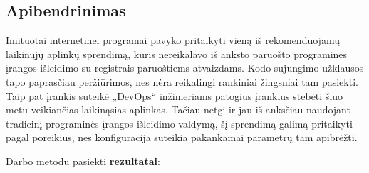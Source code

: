 \documentclass{VUMIFPSkursinis}
\begin{document}
\subsection{Apibendrinimas}

Imituotai internetinei programai pavyko pritaikyti vieną iš rekomenduojamų laikinųjų aplinkų sprendimą, kuris nereikalavo iš anksto paruošto programinės įrangos išleidimo su registrais paruoštiems atvaizdams. Kodo sujungimo užklausos tapo paprasčiau peržiūrimos, nes nėra reikalingi rankiniai žingsniai tam pasiekti. Taip pat įrankis suteikė „DevOps“ inžinieriams patogius įrankius stebėti šiuo metu veikiančias laikinąsias aplinkas. Tačiau netgi ir jau iš anksčiau naudojant tradicinį programinės įrangos išleidimo valdymą, šį sprendimą galimą pritaikyti pagal poreikius, nes konfigūracija suteikia pakankamai parametrų tam apibrėžti.


Darbo metodu pasiekti \textbf{rezultatai}:
\end{document}

